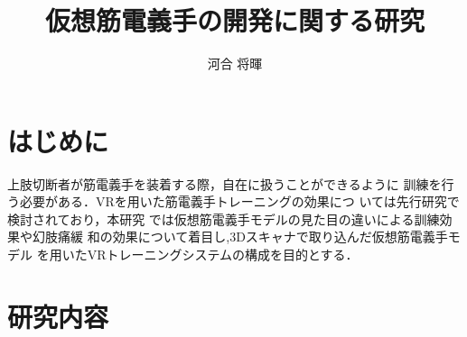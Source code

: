 \documentclass{ltjsarticle}
\title{仮想筋電義手の開発に関する研究}
\author{河合 将暉}
\begin{document}
\maketitle

\section{はじめに}
	上肢切断者が筋電義手を装着する際，自在に扱うことができるように
	訓練を行う必要がある．VRを用いた筋電義手トレーニングの効果につ
	いては先行研究\cite{ref:1}\cite{ref:2}で検討されており，本研究
	では仮想筋電義手モデルの見た目の違いによる訓練効果や幻肢痛緩
	和の効果について着目し,3Dスキャナで取り込んだ仮想筋電義手モデル
	を用いたVRトレーニングシステムの構成を目的とする．
	\vspace{-10pt}

\section{研究内容}
\end{document}
